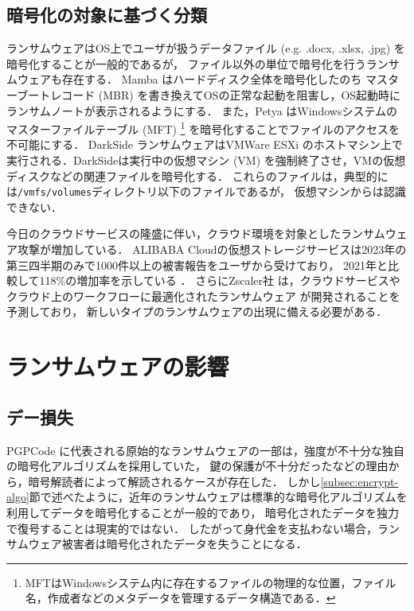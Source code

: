 \subsection{暗号化の対象に基づく分類}
ランサムウェアはOS上でユーザが扱うデータファイル (e.g. .docx, .xlsx, .jpg) を暗号化することが一般的であるが，
ファイル以外の単位で暗号化を行うランサムウェアも存在する．
Mamba \cite{mamba-petya} はハードディスク全体を暗号化したのち
マスターブートレコード (MBR) を書き換えてOSの正常な起動を阻害し，OS起動時にランサムノートが表示されるようにする．
また，Petya \cite{mamba-petya} はWindowsシステムのマスターファイルテーブル (MFT)
\footnote{MFTはWindowsシステム内に存在するファイルの物理的な位置，ファイル名，作成者などのメタデータを管理するデータ構造である．}
を暗号化することでファイルのアクセスを不可能にする．
DarkSide \cite{DarkSide42:online} ランサムウェアはVMWare ESXi \cite{VMwarevS52:online}
のホストマシン上で実行される．DarkSideは実行中の仮想マシン (VM) を強制終了させ，VMの仮想ディスクなどの関連ファイルを暗号化する．
これらのファイルは，典型的には\texttt{/vmfs/volumes}ディレクトリ以下のファイルであるが，
仮想マシンからは認識できない．

今日のクラウドサービスの隆盛に伴い，クラウド環境を対象としたランサムウェア攻撃が増加している．
ALIBABA Cloudの仮想ストレージサービスは2023年の第三四半期のみで1000件以上の被害報告をユーザから受けており，
2021年と比較して118\%の増加率を示している \cite{wang2024ransom}．
さらにZscaler社  は，クラウドサービスやクラウド上のワークフローに最適化されたランサムウェア
が開発されることを予測\cite{zscaler-ransomware}しており，
新しいタイプのランサムウェアの出現に備える必要がある．

\section{ランサムウェアの影響}
\subsection{デー損失}
PGPCode \cite{PGPCoder42:online}に代表される原始的なランサムウェアの一部は，強度が不十分な独自の暗号化アルゴリズムを採用していた，
鍵の保護が不十分だったなどの理由から，暗号解読者によって解読されるケースが存在した．
しかし\ref{subsec:encrypt-algo}節で述べたように，近年のランサムウェアは標準的な暗号化アルゴリズムを利用してデータを暗号化することが一般的であり，
暗号化されたデータを独力で復号することは現実的ではない．
したがって身代金を支払わない場合，ランサムウェア被害者は暗号化されたデータを失うことになる．

